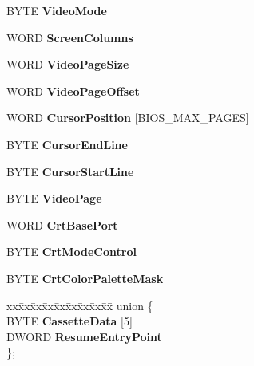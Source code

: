 \begin{DoxyCompactItemize}
B\+Y\+TE {\bfseries Video\+Mode}
\item 
\mbox{\label{struct_b_i_o_s___d_a_t_a___a_r_e_a_afcc97e3e59b60e2daf89cd836a95b10b}} 
W\+O\+RD {\bfseries Screen\+Columns}
\item 
\mbox{\label{struct_b_i_o_s___d_a_t_a___a_r_e_a_a45b3bcdc52d18032b8d1500260fd75e6}} 
W\+O\+RD {\bfseries Video\+Page\+Size}
\item 
\mbox{\label{struct_b_i_o_s___d_a_t_a___a_r_e_a_ab00e16a532e602b3d2077a0253ed54cb}} 
W\+O\+RD {\bfseries Video\+Page\+Offset}
\item 
\mbox{\label{struct_b_i_o_s___d_a_t_a___a_r_e_a_a7e2db12f554d086739dcd928d1395ac0}} 
W\+O\+RD {\bfseries Cursor\+Position} \mbox{[}B\+I\+O\+S\+\_\+\+M\+A\+X\+\_\+\+P\+A\+G\+ES\mbox{]}
\item 
\mbox{\label{struct_b_i_o_s___d_a_t_a___a_r_e_a_a178ca699e91a70c44d5d1ef26bb954ce}} 
B\+Y\+TE {\bfseries Cursor\+End\+Line}
\item 
\mbox{\label{struct_b_i_o_s___d_a_t_a___a_r_e_a_a33fc7c04e8e3cd4067265dc915a8b5eb}} 
B\+Y\+TE {\bfseries Cursor\+Start\+Line}
\item 
\mbox{\label{struct_b_i_o_s___d_a_t_a___a_r_e_a_a58e2fb9b58690f6a80db94b0075f1ef6}} 
B\+Y\+TE {\bfseries Video\+Page}
\item 
\mbox{\label{struct_b_i_o_s___d_a_t_a___a_r_e_a_a6d62cc18f4f67618ea43b4366bcab86e}} 
W\+O\+RD {\bfseries Crt\+Base\+Port}
\item 
\mbox{\label{struct_b_i_o_s___d_a_t_a___a_r_e_a_a4c7227c098b861adf9e2866e8bc33a3d}} 
B\+Y\+TE {\bfseries Crt\+Mode\+Control}
\item 
\mbox{\label{struct_b_i_o_s___d_a_t_a___a_r_e_a_a647d23f984793171302938b2be5f8c84}} 
B\+Y\+TE {\bfseries Crt\+Color\+Palette\+Mask}
\item 
\mbox{\label{struct_b_i_o_s___d_a_t_a___a_r_e_a_a8a6f927c628cc2227aeeabdb965ad40a}} 
\begin{tabbing}
xx\=xx\=xx\=xx\=xx\=xx\=xx\=xx\=xx\=\kill
union \{\\
\>BYTE {\bfseries CassetteData} \mbox{[}5\mbox{]}\\
\>DWORD {\bfseries ResumeEntryPoint}\\
\}; \\


\end{tabbing}
\end{DoxyCompactItemize}
